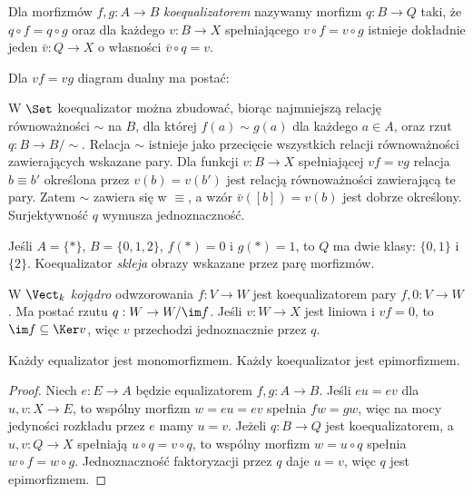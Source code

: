 \begin{definicja}[Koequalizator]\label{def:coeq}
Dla morfizmów $f,g:A\to B$ \emph{koequalizatorem} nazywamy morfizm $q:B\to Q$ taki, że $q\circ f=q\circ g$ oraz dla każdego $v:B\to X$ spełniającego $v\circ f=v\circ g$ istnieje dokładnie jeden $\bar v:Q\to X$ o własności $\bar v\circ q=v$.
\end{definicja}
Dla $vf=vg$ diagram dualny ma postać:
\begin{center}
\end{center}

\begin{przyklad}
W $\Set$ koequalizator można zbudować, biorąc najmniejszą relację równoważności $\sim$ na $B$, dla której $f(a)\sim g(a)$ dla każdego $a\in A$, oraz rzut $q:B\to B/{\sim}$. Relacja $\sim$ istnieje jako przecięcie wszystkich relacji równoważności zawierających wskazane pary. Dla funkcji $v:B\to X$ spełniającej $vf=vg$ relacja $b\equiv b'$ określona przez $v(b)=v(b')$ jest relacją równoważności zawierającą te pary. Zatem $\sim$ zawiera się w $\equiv$, a wzór $\bar v([b])=v(b)$ jest dobrze określony. Surjektywność $q$ wymusza jednoznaczność.

Jeśli $A=\{*\}$, $B=\{0,1,2\}$, $f(*)=0$ i $g(*)=1$, to $Q$ ma dwie klasy: $\{0,1\}$ i $\{2\}$. Koequalizator \emph{skleja} obrazy wskazane przez parę morfizmów.
\end{przyklad}

\begin{przyklad}[Kojądro]
W $\Vect_k$ \emph{kojądro} odwzorowania $f:V\to W$ jest koequalizatorem pary $f,0:V\to W$. Ma postać rzutu $q:W\to W/\im f$. Jeśli $v:W\to X$ jest liniowa i $vf=0$, to $\im f\subseteq\Ker v$, więc $v$ przechodzi jednoznacznie przez $q$.
\end{przyklad}

\begin{stwierdzenie}
Każdy equalizator jest monomorfizmem. Każdy koequalizator jest epimorfizmem.
\end{stwierdzenie}
\begin{proof}
Niech $e:E\to A$ będzie equalizatorem $f,g:A\to B$. Jeśli $eu=ev$ dla $u,v:X\to E$, to wspólny morfizm $w=eu=ev$ spełnia $fw=gw$, więc na mocy jedyności rozkładu przez $e$ mamy $u=v$. Jeżeli $q:B\to Q$ jest koequalizatorem, a $u,v:Q\to X$ spełniają $u\circ q=v\circ q$, to wspólny morfizm $w=u\circ q$ spełnia $w\circ f=w\circ g$. Jednoznaczność faktoryzacji przez $q$ daje $u=v$, więc $q$ jest epimorfizmem.
\end{proof}


